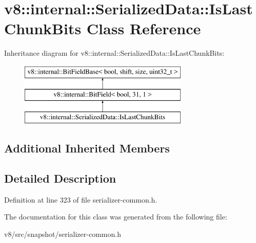 \hypertarget{classv8_1_1internal_1_1SerializedData_1_1IsLastChunkBits}{}\section{v8\+:\+:internal\+:\+:Serialized\+Data\+:\+:Is\+Last\+Chunk\+Bits Class Reference}
\label{classv8_1_1internal_1_1SerializedData_1_1IsLastChunkBits}
Inheritance diagram for v8\+:\+:internal\+:\+:Serialized\+Data\+:\+:Is\+Last\+Chunk\+Bits\+:\begin{figure}[H]
\begin{center}
\leavevmode
\includegraphics[height=3.000000cm]{classv8_1_1internal_1_1SerializedData_1_1IsLastChunkBits}
\end{center}
\end{figure}
\subsection*{Additional Inherited Members}


\subsection{Detailed Description}


Definition at line 323 of file serializer-\/common.\+h.



The documentation for this class was generated from the following file\+:\begin{DoxyCompactItemize}
\item 
v8/src/snapshot/serializer-\/common.\+h\end{DoxyCompactItemize}
